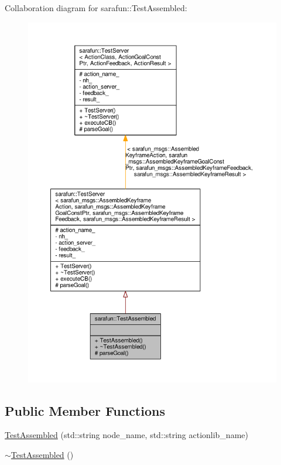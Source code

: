 Collaboration diagram for sarafun\-:\-:Test\-Assembled\-:\nopagebreak
\begin{figure}[H]
\begin{center}
\leavevmode
\includegraphics[width=350pt]{d8/d24/classsarafun_1_1TestAssembled__coll__graph}
\end{center}
\end{figure}
\subsection*{Public Member Functions}
\begin{DoxyCompactItemize}
\item 
\hyperlink{classsarafun_1_1TestAssembled_a8dc24147e3bf80fc15270d83b1f49c89_a8dc24147e3bf80fc15270d83b1f49c89}{Test\-Assembled} (std\-::string node\-\_\-name, std\-::string actionlib\-\_\-name)
\item 
\hyperlink{classsarafun_1_1TestAssembled_a5f9109b205eea68a6f54773657198880_a5f9109b205eea68a6f54773657198880}{$\sim$\-Test\-Assembled} ()
\end{DoxyCompactItemize}
